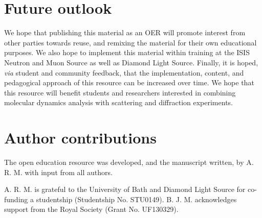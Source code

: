\documentclass[amsmath,amssymb,twocolumn,superscriptaddress]{revtex4-1}
\begin{document}
\section{Future outlook}

We hope that publishing this material as an OER will promote interest from other parties towards reuse, and remixing the material for their own educational purposes.
We also hope to implement this material within training at the ISIS Neutron and Muon Source as well as Diamond Light Source.
Finally, it is hoped, \textit{via} student and community feedback, that the implementation, content, and pedagogical approach of this resource can be increased over time. We hope that this resource will benefit students and researchers interested in combining molecular dynamics analysis with scattering and diffraction experiments.

\section{Author contributions}

The open education resource was developed, and the manuscript written, by A. R. M. with input from all authors.

\begin{acknowledgements}
A. R. M. is grateful to the University of Bath and Diamond Light Source for co-funding a studentship (Studentship No. STU0149).
B. J. M. acknowledges support from the Royal Society (Grant No. UF130329).
\end{acknowledgements}


\end{document}
